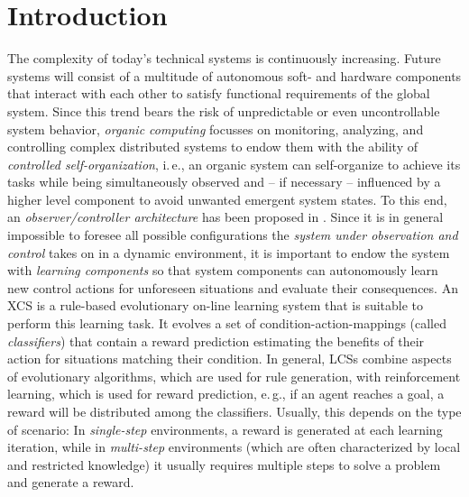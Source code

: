 \section{Introduction}
\label{section:introduction}

The complexity of today's technical systems is continuously increasing. Future systems will consist of a multitude of autonomous soft- and hardware components that interact with each other to satisfy functional requirements of the global system. Since this trend bears the risk of unpredictable or even uncontrollable system behavior, \emph{organic computing} \cite{Sch05b} %
focusses on monitoring, analyzing, and controlling complex distributed systems to endow them with the ability of \emph{controlled self-organization}, i.\,e., an or\-ga\-nic system can self-organize to achieve its tasks while being simultaneously observed and -- if necessary -- influenced by a higher level component to avoid unwanted emergent system states. To this end, an \emph{observer/controller architecture} has been proposed in \cite{RMB+06}. %
Since it is in general impossible to foresee all possible configurations the \emph{system under observation and control} takes on in a dynamic environment, it is important to endow the system with \emph{learning components} so that system components can autonomously learn new control actions for unforeseen situations and evaluate their consequences. An XCS \cite{Wil95} is a rule-based evolutionary on-line learning system that is suitable to perform this learning task. It evolves a set of condition-action-mappings (called \emph{classifiers}) that contain a reward prediction estimating the benefits of their action for situations matching their condition. 
In general, LCSs combine aspects of evolutionary algorithms, which are used for rule generation, with reinforcement learning, which is used for reward prediction, e.\,g., if an agent reaches a goal, a reward will be distributed among the classifiers. 
Usually, this depends on the type of scenario: In \emph{single-step} environments, a reward is generated at each learning iteration, while in \emph{multi-step} environments (which are often characterized by local and restricted knowledge) 
it usually requires multiple steps to solve a problem and generate a reward.

